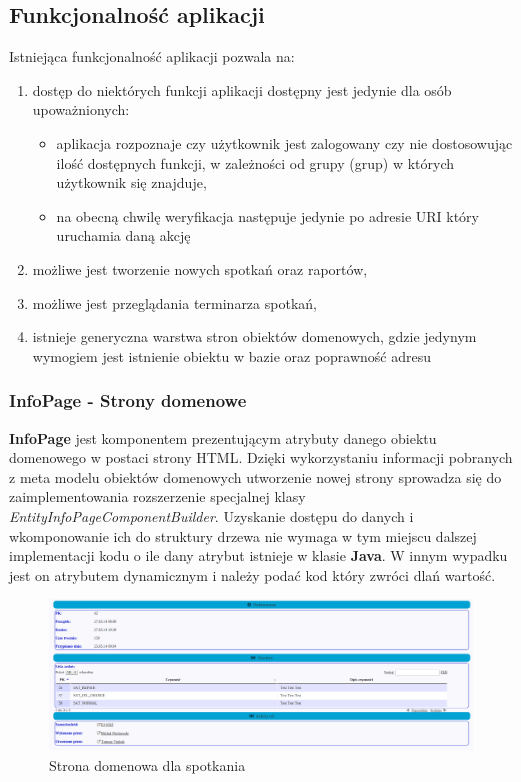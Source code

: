 	\subsection{Funkcjonalność aplikacji}
	Istniejąca funkcjonalność aplikacji pozwala na:
	\begin{enumerate}
		\item dostęp do niektórych funkcji aplikacji dostępny jest jedynie dla osób upoważnionych:
		\begin{itemize}
			\item aplikacja rozpoznaje czy użytkownik jest zalogowany czy nie dostosowując ilość dostępnych funkcji,
			w zależności od grupy (grup) w których użytkownik się znajduje,
			\item na obecną chwilę weryfikacja następuje jedynie po adresie URI który uruchamia daną akcję
		\end{itemize}
		\item możliwe jest tworzenie nowych spotkań oraz raportów,
		\item możliwe jest przeglądania terminarza spotkań,
		\item istnieje generyczna warstwa stron obiektów domenowych, gdzie jedynym wymogiem jest istnienie obiektu w bazie
		oraz poprawność adresu
	\end{enumerate}

	\subsubsection{InfoPage - Strony domenowe}
		\textbf{InfoPage} jest komponentem prezentującym atrybuty danego obiektu domenowego w postaci strony HTML. 
		Dzięki wykorzystaniu informacji pobranych z meta modelu obiektów domenowych utworzenie nowej strony
		sprowadza się do zaimplementowania rozszerzenie specjalnej klasy \emph{EntityInfoPageComponentBuilder}.
		Uzyskanie dostępu do danych i wkomponowanie ich do struktury drzewa nie wymaga w tym miejscu dalszej implementacji
		kodu o ile dany atrybut istnieje w klasie \textbf{Java}. W innym wypadku jest on atrybutem dynamicznym
		i należy podać kod który zwróci dlań wartość. 
		\begin{figure}[H]
			\centering
			\includegraphics[width=1.0\textwidth]{images/infoPage}
			\caption[Strona domenowa dla spotkania]{
				Strona domenowa dla spotkania	
			}
			\label{app:infoPage}
		\end{figure}	
		
